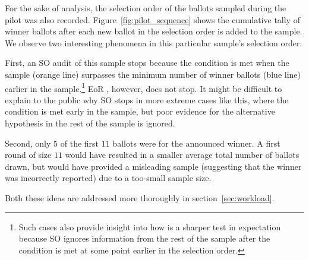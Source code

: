 For the sake of analysis, the selection order of the ballots sampled during the pilot was also recorded. Figure~\ref{fig:pilot_sequence} shows the cumulative tally of winner ballots after each new ballot in the selection order is added to the sample. We observe two interesting phenomena in this particular sample's selection order. 
\begin{description}
\item First, an SO \BRAVO audit of this sample stops because the \BRAVO condition is met when the sample (orange line) surpasses the minimum number of winner ballots (blue line) earlier in the sample.\footnote{Such cases also provide insight into how \Providence is a sharper test in expectation because SO \BRAVO ignores information from the rest of the sample after the \BRAVO condition is met at some point earlier in the selection order.} EoR \BRAVO, however, does not stop. It might be difficult to explain to the public why SO \BRAVO stops in more extreme cases like this, where the condition is met early in the sample, but poor evidence for the alternative hypothesis in the rest of the sample is ignored. 
\item Second, only $5$ of the first $11$ ballots were for the announced winner. A first round of size $11$ would have resulted in a smaller average total number of ballots drawn, but would have provided a misleading sample (suggesting that the winner was incorrectly reported) due to a too-small sample size. 
\end{description}
Both these ideas are addressed more thoroughly in section~\ref{sec:workload}.

